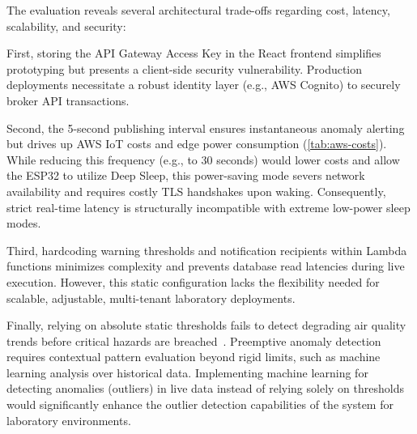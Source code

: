 The evaluation reveals several architectural trade-offs regarding cost, latency, scalability, and security:

First, storing the API Gateway Access Key in the React frontend simplifies prototyping but
presents a client-side security vulnerability. Production deployments necessitate a robust
identity layer (e.g., AWS Cognito) to securely broker API transactions.

Second, the 5-second publishing interval ensures instantaneous anomaly alerting but drives up AWS
IoT costs and edge power consumption (\cref{tab:aws-costs}). While reducing this frequency
(e.g., to 30 seconds) would lower costs and allow the ESP32 to utilize Deep Sleep,
this power-saving mode severs network availability and requires costly TLS handshakes upon waking.
Consequently, strict real-time latency is structurally incompatible with extreme low-power sleep modes.

Third, hardcoding warning thresholds and notification recipients within Lambda functions minimizes
complexity and prevents database read latencies during live execution. However, this static
configuration lacks the flexibility needed for scalable, adjustable, multi-tenant laboratory deployments.

Finally, relying on absolute static thresholds fails to detect degrading air quality trends before
critical hazards are breached~\cite{mumtaz2021internet}.
Preemptive anomaly detection requires contextual pattern evaluation beyond rigid limits,
such as machine learning analysis over historical data. Implementing machine learning
for detecting anomalies (outliers) in live data instead of relying solely on thresholds
would significantly enhance the outlier detection capabilities of the system for laboratory environments.
